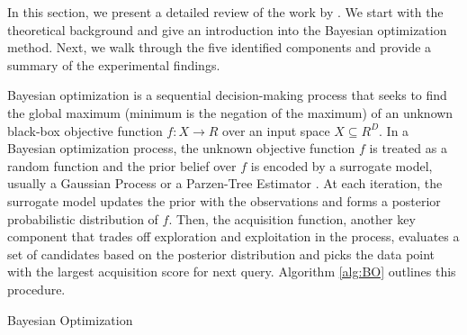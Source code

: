 \documentclass[a4paper,oneside,bibliography=totoc]{scrbook}
\begin{document}
In this section, we present a detailed review of the work by \cite{white2019bananas}. We start with the theoretical background and give an introduction into the Bayesian optimization method. Next, we walk through the five identified components and provide a summary of the experimental findings.

Bayesian optimization \cite{Mockus1978} is a sequential decision-making process that seeks to find the global maximum (minimum is the negation of the maximum) of an unknown black-box objective function $f : X \rightarrow R$ over an input space $X \subseteq R^D$. In a Bayesian optimization process, the unknown objective function $f$ is treated as a random function and the prior belief over $f$ is encoded by a surrogate model, usually a Gaussian Process or a Parzen-Tree Estimator \cite{bergstra2011algorithms}. At each iteration, the surrogate model updates the prior with the observations and forms a posterior probabilistic distribution of $f$. Then, the acquisition function, another key component that trades off exploration and exploitation in the process, evaluates a set of candidates based on the posterior distribution and picks the data point with the largest acquisition score for next query. Algorithm \ref{alg:BO} outlines this procedure.

\begin{algorithm}[t]
  \caption{Bayesian Optimization}
  \label{alg:BO}
 \end{algorithm}
\end{document}

